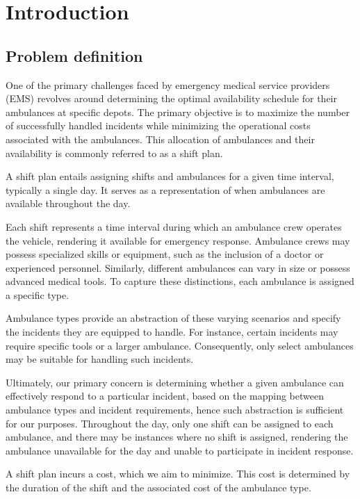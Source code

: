 \setlength{\parindent}{0pt}

\chapter{Introduction}

\section{Problem definition}

One of the primary challenges faced by emergency medical service providers
(EMS) revolves around determining the optimal availability schedule for their
ambulances at specific depots. The primary objective is to maximize the number
of successfully handled incidents while minimizing the operational costs
associated with the ambulances. This allocation of ambulances and their
availability is commonly referred to as a shift plan.

A shift plan entails assigning shifts and ambulances for a given time interval,
typically a single day. It serves as a representation of when ambulances are
available throughout the day.

Each shift represents a time interval during which an ambulance crew operates
the vehicle, rendering it available for emergency response. Ambulance crews may
possess specialized skills or equipment, such as the inclusion of a doctor or
experienced personnel. Similarly, different ambulances can vary in size or
possess advanced medical tools. To capture these distinctions, each ambulance
is assigned a specific type.

Ambulance types provide an abstraction of these varying scenarios and specify
the incidents they are equipped to handle. For instance, certain incidents may
require specific tools or a larger ambulance. Consequently, only select
ambulances may be suitable for handling such incidents.

Ultimately, our primary concern is determining whether a given ambulance can
effectively respond to a particular incident, based on the mapping between
ambulance types and incident requirements, hence such abstraction is sufficient
for our purposes. Throughout the day, only one shift can be assigned to each
ambulance, and there may be instances where no shift is assigned, rendering the
ambulance unavailable for the day and unable to participate in incident
response.

A shift plan incurs a cost, which we aim to minimize. This cost is determined
by the duration of the shift and the associated cost of the ambulance type.


